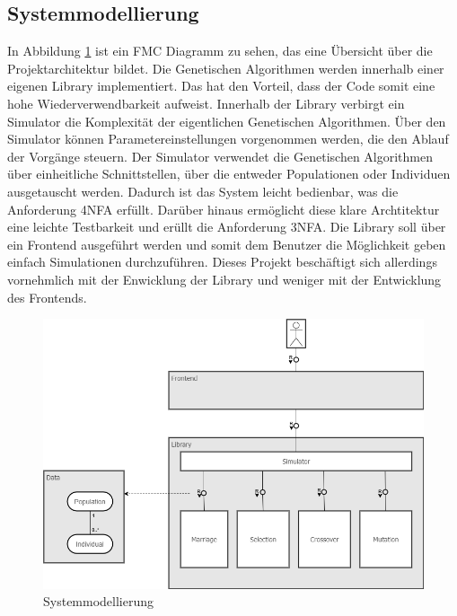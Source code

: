\subsection{Systemmodellierung}

In Abbildung \ref{fig:systemmodellierung} ist ein FMC Diagramm zu sehen, das eine Übersicht über die Projektarchitektur bildet.
Die Genetischen Algorithmen werden innerhalb einer eigenen Library implementiert. Das hat den Vorteil, dass der Code somit eine hohe Wiederverwendbarkeit aufweist.
Innerhalb der Library verbirgt ein Simulator die Komplexität der eigentlichen Genetischen Algorithmen. Über den Simulator können Parametereinstellungen vorgenommen werden, die den Ablauf der Vorgänge steuern.
Der Simulator verwendet die Genetischen Algorithmen über einheitliche Schnittstellen, über die entweder Populationen oder Individuen ausgetauscht werden. Dadurch ist das System leicht bedienbar, was die Anforderung 4NFA erfüllt. Darüber hinaus ermöglicht diese klare Archtitektur eine leichte Testbarkeit und erüllt die Anforderung 3NFA. Die Library soll über ein Frontend ausgeführt werden und somit dem Benutzer die Möglichkeit geben einfach Simulationen durchzuführen. Dieses Projekt beschäftigt sich allerdings vornehmlich mit der Enwicklung der Library und weniger mit der Entwicklung des Frontends.

\begin{figure}[H]
\centering
\includegraphics[width=1\textwidth]{img/Vortrag/Systemmodellierung.png}
\caption{Systemmodellierung}
\label{fig:systemmodellierung}
\end{figure}

